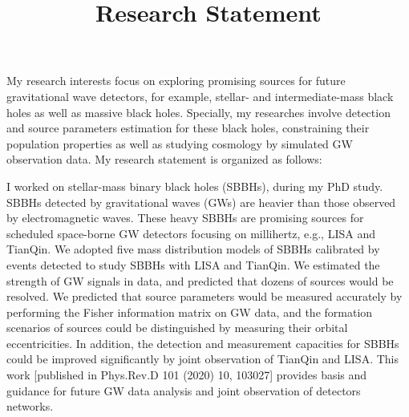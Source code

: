 \documentclass[12pt,a4paper,sans]{article}%
\title{\vspace{-2.5cm}\Huge Research Statement \vspace{-2.2em}}
\date{}
\begin{document}
\maketitle

My research interests focus on exploring promising sources for future gravitational wave detectors, for example, stellar- and
intermediate-mass black holes as well as massive black holes. Specially, my researches involve detection
and source parameters estimation for these black holes, constraining their population properties as well as studying
cosmology by simulated GW observation data. My research statement is organized as
follows:  

I worked on stellar-mass binary black holes (SBBHs), during my PhD study. SBBHs detected by
gravitational waves (GWs) are heavier than those observed by electromagnetic waves. These heavy SBBHs are promising sources for scheduled
space-borne GW detectors focusing on millihertz, e.g., LISA and TianQin. We adopted five mass
distribution models of SBBHs calibrated by events detected to study SBBHs with LISA and TianQin. We estimated the
strength of GW signals in data, and predicted that dozens of sources would be resolved. We predicted that source parameters
would be measured accurately by performing the Fisher information matrix on GW data, and the formation scenarios of sources
could be distinguished by measuring their orbital eccentricities. In addition, the detection and measurement capacities
for SBBHs could be improved significantly by joint
observation of TianQin and LISA. This work [published in Phys.Rev.D 101 (2020) 10, 103027] provides basis and guidance for future GW
data analysis and joint observation of detectors networks. 
\end{document}
